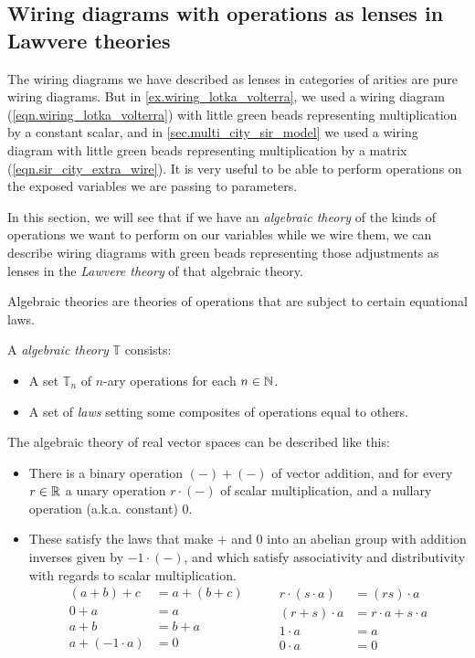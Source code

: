\documentclass[DynamicalBook]{subfiles}
\begin{document}
\subsection{Wiring diagrams with operations as lenses in Lawvere theories}

The wiring diagrams we have described as lenses in categories of arities are
pure wiring diagrams. But in \cref{ex.wiring_lotka_volterra}, we used a wiring
diagram (\cref{eqn.wiring_lotka_volterra}) with little green beads representing multiplication by a constant
scalar, and in \cref{sec.multi_city_sir_model} we used a wiring diagram with
little green beads representing multiplication by a matrix
(\cref{eqn.sir_city_extra_wire}). It is very useful to be able to perform
operations on the exposed variables we
are passing to parameters.

In this section, we will see that if we have an \emph{algebraic theory} of the
kinds of operations we want to perform on our variables while we wire them, we can
describe wiring diagrams with green beads representing those adjustments as
lenses in the \emph{Lawvere theory} of that algebraic theory.

Algebraic theories are theories of operations that are subject to certain
equational laws.
\begin{informal}
A \emph{algebraic theory} $\mathbb{T}$ consists:
\begin{itemize}
  \item A set $\mathbb{T}_n$ of $n$-ary operations for each $n \in \mathbb{N}$.
  \item A set of \emph{laws} setting some composites of operations equal to others.
\end{itemize}
\end{informal}

\begin{example}\label{ex.vector_theory}
The algebraic theory of real vector spaces can be described like this:
\begin{itemize}
\item There is a binary operation $(-)+(-)$ of vector addition, and for every $r \in
  \mathbb{R}$ a unary operation $r\cdot(-)$ of scalar multiplication, and a nullary
  operation (a.k.a. constant) $0$.
\item These satisfy the laws that make $+$ and $0$ into an abelian group with
  addition inverses given by $-1 \cdot(-)$, and which satisfy associativity and
  distributivity with regards to scalar multiplication.
\[
\begin{aligned}
(a + b) + c &= a + (b + c)\\
0 + a &= a \\
a + b &= b + a \\
a + (-1 \cdot a) &= 0
\end{aligned}
\quad\quad
\begin{aligned}
r \cdot (s \cdot a) &= (rs) \cdot a \\
(r + s) \cdot a &= r \cdot a + s \cdot a \\
 1 \cdot a &= a\\
 0 \cdot a &= 0
\end{aligned}
\]
\end{itemize}
\end{example}
\end{document}
